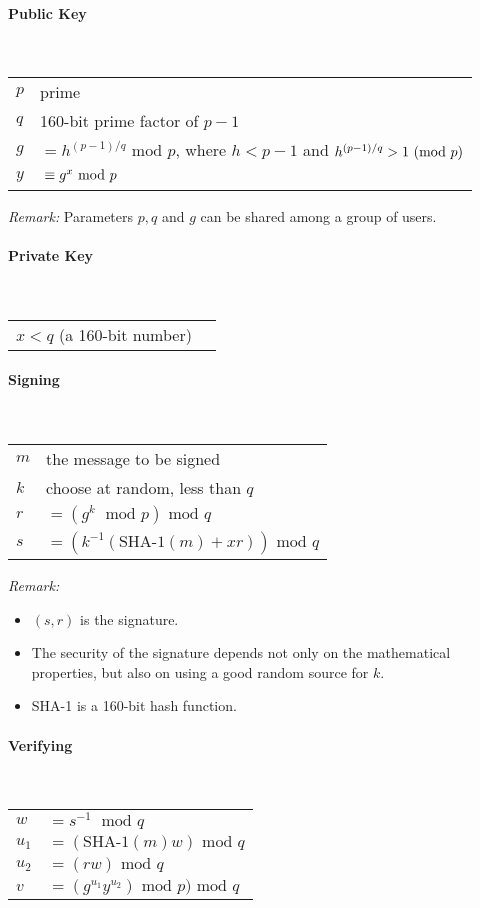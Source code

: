 \begin{cryptoprocedure}
\paragraph*{Public Key}\strut\\
\begin{tabular}{l@{ }l}
$p$ & prime \\
$q$ & 160-bit prime factor of $p - 1$ \\
$g$ & $ = h^{(p-1)/q}  \mbox{ mod } p$, where $h < p - 1$ and
$h^{(p-1)/q} > 1  \ (\mbox{mod }p)$ \\
$y$ & $\strut \equiv  g^x  \mbox{ mod } p$ 
\end{tabular}

\emph{Remark:} Parameters $p,q$ and $g$ can be shared among a group of users.

\paragraph*{Private Key}\strut\\
\begin{tabular}{l@{ }l}
$x < q$ (a 160-bit number) 
\end{tabular}

\paragraph*{Signing}\strut\\
\begin{tabular}{l@{ }l}
$m$ & the message to be signed\\
$k$ & choose at random\index{Random}, less than $q$\\
$r$ & $= (g^k \; \mbox{ mod } p) \mbox{ mod } q$\\
$s$ & $= (k^{-1}(\mbox{SHA-1}(m) + xr)) \mbox{ mod } q$
\end{tabular}

\emph{Remark:}
\begin{itemize}
\item $(s,r)$ is the signature.
\item The security of the signature depends not only on the mathematical
  properties, but also on using a good random source  for $k$.
\item SHA-1  is a 160-bit hash function.
\end{itemize}
\paragraph*{Verifying}\strut\\
\begin{tabular}{l@{ }l}
$w$ & $= s^{-1} \;  \mbox{ mod } q$\\
$u_1$ & $= (\mbox{SHA-1}(m)w) \mbox{ mod } q$\\
$u_2$ & $= (rw)  \mbox{ mod } q$\\
$v$ & $= (g^{u_1}y^{u_2}) \mbox{ mod } p)  \mbox{ mod } q$\\


\end{tabular}
\end{cryptoprocedure}
